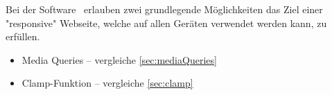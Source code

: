 

Bei der Software \ZELIA\ erlauben zwei grundlegende Möglichkeiten das Ziel einer "responsive" Webseite, welche auf allen Geräten verwendet werden kann, zu erfüllen.

\begin{itemize}
    \item Media Queries -- vergleiche \ref{sec:mediaQueries}
    \item Clamp-Funktion -- vergleiche \ref{sec:clamp}
\end{itemize}



\clearpage
